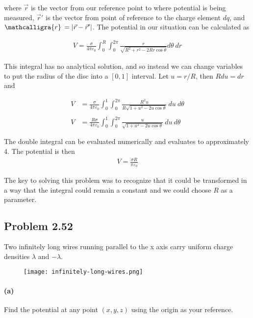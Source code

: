 \documentclass{article}
\newcommand{\scriptr}{\mathcalligra{r}\,}
\begin{document}
where $\vec{r}$ is the vector from our reference point to where potential is being measured, $\vec{r}'$ is the vector from point of reference to the charge element $dq$, and $\scriptr = |\vec{r} - \vec{r}'|$. The potential in our situation can be calculated as 

\begin{align*}
    V = \frac{\sigma}{4\pi \varepsilon_0} \int_0^R \int_0^{2\pi} \frac{r}{\sqrt{R^2 + r^2 - 2Rr\cos\theta}} d\theta\ dr
\end{align*}

This integral has no analytical solution, and so instead we can change variables to put the radius of the disc into a $[0,1]$ interval. Let $u = r/R$, then $R du = dr$ and 

\begin{align*}
    V &= \frac{\sigma}{4\pi \varepsilon_0}\int_0^1 \int_0^{2\pi}\frac{R^2u}{R\sqrt{1 + u^2 - 2u\cos\theta}} \ du\ d\theta \\
    \\
    V &= \frac{R\sigma}{4\pi \varepsilon_0}\int_0^1 \int_0^{2\pi}\frac{u}{\sqrt{1 + u^2 - 2u\cos\theta}} \ du\ d\theta
\end{align*}

The double integral can be evaluated numerically and evaluates to approximately 4. The potential is then 
\begin{align*}
    V = \frac{\sigma R}{\pi \varepsilon_0}
\end{align*}

The key to solving this problem was to recognize that it could be transformed in a way that the integral could remain a constant and we could choose $R$ as a parameter.

\newpage

\subsection*{Problem 2.52}
Two infinitely long wires running parallel to the x axis carry uniform charge densities $\lambda$ and $-\lambda$.

\begin{figure}[h]
    \centering
    \texttt{[image: infinitely-long-wires.png]}
\end{figure}

\paragraph{(a)} Find the potential at any point $(x, y, z)$ using the origin as your reference. 
\end{document}
